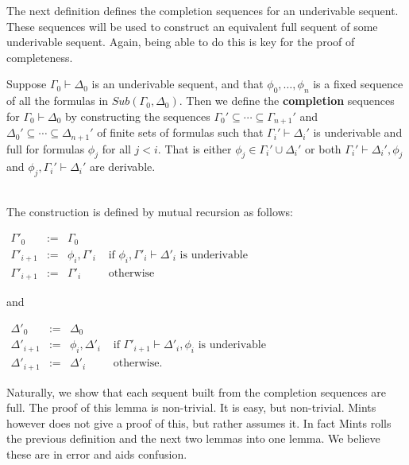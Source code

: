 \documentclass{article}
\begin{document}
The next definition defines the completion sequences for an underivable sequent.  These 
sequences will be used to construct an equivalent full sequent of some underivable sequent.
Again, being able to do this is key for the proof of completeness.
\begin{definition}
  \label{def:completion_sequence}
  Suppose $\Gamma_0 \vdash \Delta_0$ is an underivable sequent, and that
  $\phi_0, \ldots, \phi_n$ is a fixed sequence of all the formulas in $Sub(\Gamma_0,\Delta_0)$.  
  Then we define the \textbf{completion} sequences for $\Gamma_0 \vdash \Delta_0$ by constructing the sequences
  $\Gamma_0' \subseteq \cdots \subseteq \Gamma_{n+1}'$  and $\Delta_0' \subseteq \cdots \subseteq \Delta_{n+1}'$
  of finite sets of formulas such that $\Gamma_i' \vdash \Delta_i'$ is underivable and full for 
  formulas $\phi_j$ for all $j < i$.  That is either $\phi_j \in \Gamma_i' \cup \Delta_i'$ or both
  $\Gamma_i' \vdash \Delta_i',\phi_j$ and $\phi_j,\Gamma_i' \vdash \Delta_i'$ are derivable.

  \ \\
  The construction is defined by mutual recursion as follows:
  \begin{center}
    \begin{math}
      \begin{array}{llll}
        \Gamma'_0         & := & \Gamma_0 \\
        \Gamma'_{i+1}     & := & \phi_i,\Gamma'_i & \text{ if } \phi_i, \Gamma'_i \vdash \Delta'_i 
                                                    \text{ is underivable }\\
        \Gamma'_{i+1}     & := & \Gamma'_i & \text{ otherwise }
      \end{array}
    \end{math}
  \end{center}
  \noindent
  and \ \\
  \begin{center}
    \begin{math}
      \begin{array}{llll}
        \Delta'_0         & := & \Delta_0 \\
        \Delta'_{i+1}     & := & \phi_i,\Delta'_i & \text{ if } \Gamma'_{i+1} \vdash \Delta'_i,\phi_i
                                                    \text{ is underivable }\\
        \Delta'_{i+1}     & := & \Delta'_i & \text{ otherwise. }
      \end{array}
    \end{math}
  \end{center}
\end{definition}
\noindent
Naturally, we show that each sequent built from the completion sequences are full.  The proof of this
lemma is non-trivial.  It is easy, but non-trivial.  Mints however does not give a proof of this, but
rather assumes it.  In fact Mints rolls the previous definition and the next two lemmas into
one lemma. We believe these are in error and aids confusion.
\end{document}
